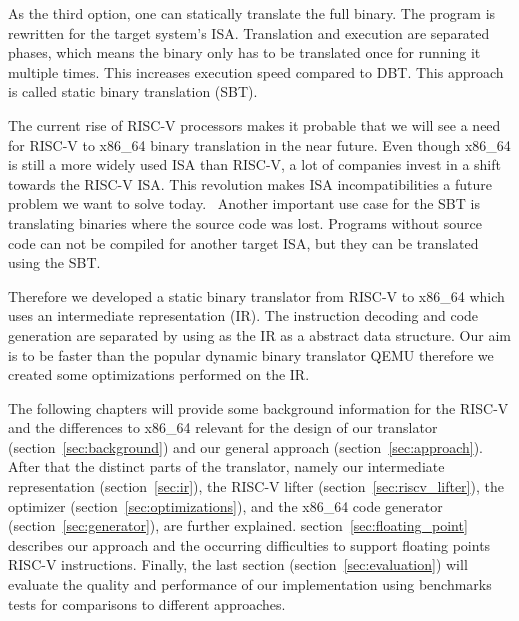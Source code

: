 \documentclass[course=eragp]{aspdoc}
\begin{document}
As the third option, one can statically translate the full binary. The program is rewritten for the
target system's ISA.
Translation and execution are separated phases, which means the binary only has to be translated once for
running it multiple times. This increases execution speed compared to DBT. This
approach is called static binary translation (SBT).~\cite{binary_translation}

\par

The current rise of RISC-V processors makes it probable that we will see a need for RISC-V to
x86\_64 binary translation in the near future. Even though x86\_64 is still a more widely used ISA
than RISC-V, a lot of companies invest in a shift towards the RISC-V ISA. This revolution makes ISA
incompatibilities a future problem we want to solve today.~\cite{riscv_rises} Another important use
case for the SBT is translating binaries where the source code was lost. Programs without source
code can not be compiled for another target ISA, but they can be translated using the SBT.

\par

Therefore we developed a static binary translator from RISC-V to x86\_64 which uses an intermediate
representation (IR). The instruction decoding and code generation are separated by using as the IR
as a abstract data structure. Our aim is to be faster than the popular dynamic binary translator
QEMU therefore we created some optimizations performed on the IR.

\par

The following chapters will provide some background information for the RISC-V and the differences
to x86\_64 relevant for the design of our translator (section~\ref{sec:background}) and our general
approach (section~\ref{sec:approach}). After that the distinct parts of the translator, namely our
intermediate representation (section~\ref{sec:ir}), the RISC-V lifter
(section~\ref{sec:riscv_lifter}), the optimizer (section~\ref{sec:optimizations}), and the x86\_64
code generator (section~\ref{sec:generator}), are further explained.
section~\ref{sec:floating_point} describes our approach and the occurring difficulties to support
floating points RISC-V instructions. Finally, the last section (section~\ref{sec:evaluation}) will
evaluate the quality and performance of our implementation using benchmarks tests for comparisons to
different approaches.
\end{document}
